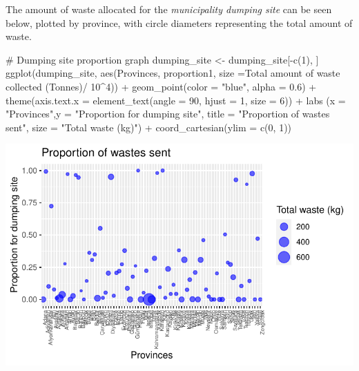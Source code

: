 \documentclass[
  11pt,
  a4paper,
  DIV=11,
  numbers=noendperiod]{scrartcl}
\newenvironment{Shaded}{\begin{snugshade}}{\end{snugshade}}
\newcommand{\AttributeTok}[1]{\textcolor[rgb]{0.40,0.45,0.13}{#1}}
\newcommand{\CommentTok}[1]{\textcolor[rgb]{0.37,0.37,0.37}{#1}}
\newcommand{\DecValTok}[1]{\textcolor[rgb]{0.68,0.00,0.00}{#1}}
\newcommand{\FloatTok}[1]{\textcolor[rgb]{0.68,0.00,0.00}{#1}}
\newcommand{\FunctionTok}[1]{\textcolor[rgb]{0.28,0.35,0.67}{#1}}
\newcommand{\NormalTok}[1]{\textcolor[rgb]{0.00,0.23,0.31}{#1}}
\newcommand{\OtherTok}[1]{\textcolor[rgb]{0.00,0.23,0.31}{#1}}
\newcommand{\SpecialCharTok}[1]{\textcolor[rgb]{0.37,0.37,0.37}{#1}}
\newcommand{\StringTok}[1]{\textcolor[rgb]{0.13,0.47,0.30}{#1}}
\begin{document}
The amount of waste allocated for the \emph{municipality dumping site}
can be seen below, plotted by province, with circle diameters
representing the total amount of waste.

\begin{Shaded}
\begin{Highlighting}[]
\CommentTok{\# Dumping site proportion graph}
\NormalTok{dumping\_site }\OtherTok{\textless{}{-}}\NormalTok{ dumping\_site[}\SpecialCharTok{{-}}\FunctionTok{c}\NormalTok{(}\DecValTok{1}\NormalTok{), ]}
\FunctionTok{ggplot}\NormalTok{(dumping\_site, }\FunctionTok{aes}\NormalTok{(Provinces, proportion1, }\AttributeTok{size =}\StringTok{\textasciigrave{}}\AttributeTok{Total amount of waste collected  (Tonnes)}\StringTok{\textasciigrave{}}\SpecialCharTok{/} \DecValTok{10}\SpecialCharTok{\^{}}\DecValTok{4}\NormalTok{)) }\SpecialCharTok{+}
  \FunctionTok{geom\_point}\NormalTok{(}\AttributeTok{color =} \StringTok{"blue"}\NormalTok{, }\AttributeTok{alpha =} \FloatTok{0.6}\NormalTok{) }\SpecialCharTok{+} \FunctionTok{theme}\NormalTok{(}\AttributeTok{axis.text.x =} \FunctionTok{element\_text}\NormalTok{(}\AttributeTok{angle =} \DecValTok{90}\NormalTok{, }\AttributeTok{hjust =} \DecValTok{1}\NormalTok{, }\AttributeTok{size =} \DecValTok{6}\NormalTok{)) }\SpecialCharTok{+}
  \FunctionTok{labs}\NormalTok{ (}\AttributeTok{x =} \StringTok{"Provinces"}\NormalTok{,}\AttributeTok{y =} \StringTok{"Proportion for dumping site"}\NormalTok{, }\AttributeTok{title =} \StringTok{"Proportion of wastes sent"}\NormalTok{, }\AttributeTok{size =} \StringTok{"Total waste (kg)"}\NormalTok{) }\SpecialCharTok{+}  \FunctionTok{coord\_cartesian}\NormalTok{(}\AttributeTok{ylim =} \FunctionTok{c}\NormalTok{(}\DecValTok{0}\NormalTok{, }\DecValTok{1}\NormalTok{))}
\end{Highlighting}
\end{Shaded}

\includegraphics{project_files/figure-pdf/unnamed-chunk-17-1.pdf}
\end{document}
